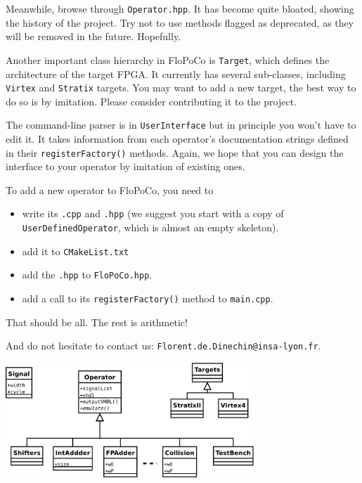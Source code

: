 \documentclass{article}
\begin{document}
Meanwhile, browse through \texttt{Operator.hpp}. It has become quite bloated, showing
the history of the project. Try not to use methods flagged as
deprecated, as they will be removed in the future. Hopefully.%

Another important class hierarchy in FloPoCo is \texttt{Target}, which
defines the architecture of the target FPGA. It currently has several sub-classes,
including \texttt{Virtex} and \texttt{Stratix} targets. You may want to
add a new target, the best way to do so is by imitation. Please
consider contributing it to the project.

The command-line parser is in \texttt{UserInterface} but in principle you won't have to edit it.
It takes information from each operator's documentation strings defined in their \texttt{registerFactory()} methods. 
Again, we hope that you can design the interface to your operator by imitation of existing ones.

To add a new operator to FloPoCo, you need to 
\begin{itemize}
\item write its \texttt{.cpp} and \texttt{.hpp} (we suggest you start with a copy of  \texttt{UserDefinedOperator}, which is almost an empty skeleton).
\item add it to \texttt{CMakeList.txt}
\item add the \texttt{.hpp} to \texttt{FloPoCo.hpp}.
\item add a call to its  \texttt{registerFactory()} method to \texttt{main.cpp}. 
\end{itemize}

That should be all. The rest is arithmetic!

And do not hesitate to contact us: \texttt{Florent.de.Dinechin@insa-lyon.fr}.

\begin{center}
  \includegraphics[width=0.7\textwidth]{../Figures/FloPoCoClasses.pdf}        
\end{center}
\end{document}
